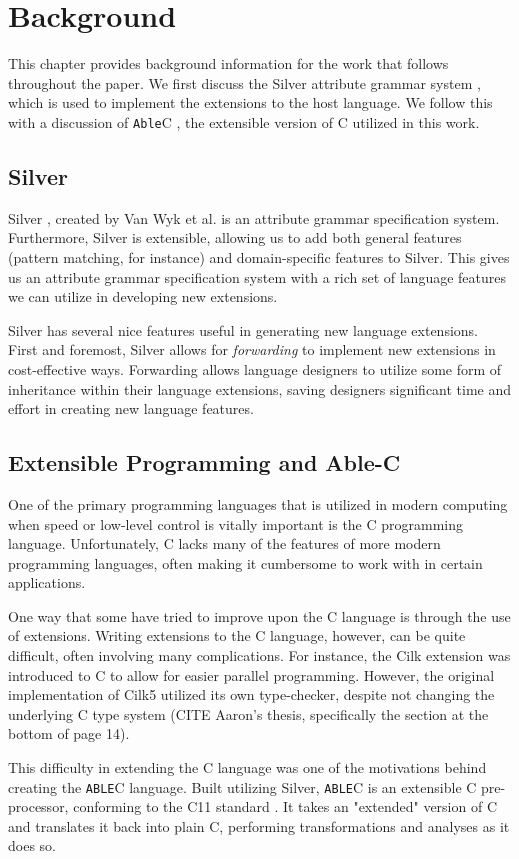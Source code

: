 \documentclass[main.tex]{subfiles}
\begin{document}
\section{Background}

This chapter provides background information for the work that follows
throughout the paper. We first discuss the Silver attribute grammar system 
\cite{silver}, which is used to implement the extensions to the host language.
We follow this with a discussion of \verb|Able|C \cite{ableC}, the extensible
version of C utilized in this work.

\subsection{Silver}
Silver \cite{1}, created by Van Wyk et al. is an attribute grammar
specification system. Furthermore, Silver is extensible, allowing us to add both
general features (pattern matching, for instance) and domain-specific features
to Silver. This gives us an attribute grammar specification system with a rich
set of language features we can utilize in developing new extensions. 

Silver has several nice features useful in generating new language extensions.
First and foremost, Silver allows for \emph{forwarding} \cite{forwarding} to 
implement new extensions in cost-effective ways. Forwarding allows language
designers to utilize some form of inheritance within their language extensions,
saving designers significant time and effort in creating new language features.

\subsection{Extensible Programming and Able-C}
One of the primary programming languages that is utilized in modern computing
when speed or low-level control is vitally important is the C programming
language. Unfortunately, C lacks many of the features of more modern programming
languages, often making it cumbersome to work with in certain applications.

One way that some have tried to improve upon the C language is through the use
of extensions. Writing extensions to the C language, however, can be quite
difficult, often involving many complications. For instance, the Cilk extension
was introduced to C to allow for easier parallel programming. However, the
original implementation of Cilk5 utilized its own type-checker, despite not
changing the underlying C type system (CITE Aaron's thesis, specifically the 
section at the bottom of page 14). 

This difficulty in extending the C language was one of the motivations behind
creating the \verb|ABLE|C language. Built utilizing Silver, \verb|ABLE|C is an 
extensible C pre-processor, conforming to the C11 standard \cite{ableC}. It takes an
"extended" version of C and translates it back into plain C, performing
transformations and analyses as it does so.
\end{document}

